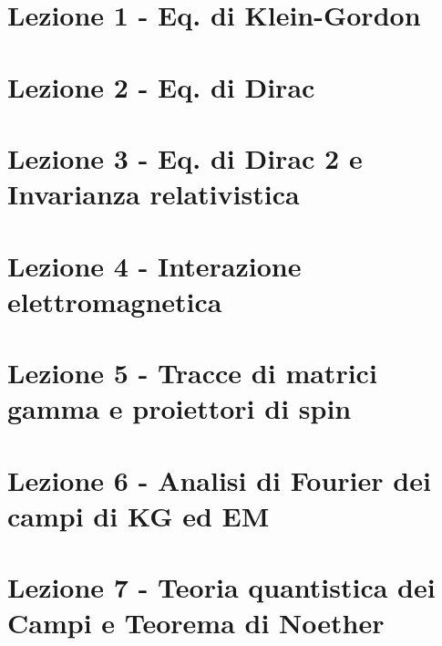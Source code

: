 \documentclass[11pt,a4paper]{book}
\renewcommand{\(}{\left(}
\renewcommand{\)}{\right)}
\begin{document}
 \thispagestyle{empty}
 \begin{titlepage}
 
 \end{titlepage}
 \clearpage{\thispagestyle{empty}\cleardoublepage}
\tableofcontents
\clearpage{\thispagestyle{empty}\cleardoublepage}

\chapter{Lezione 1 - Eq. di Klein-Gordon}
\clearpage{\thispagestyle{empty}\cleardoublepage}
\chapter{Lezione 2 - Eq. di Dirac}
\clearpage{\thispagestyle{empty}\cleardoublepage}
\chapter{Lezione 3 - Eq. di Dirac 2 e Invarianza relativistica}
\clearpage{\thispagestyle{empty}\cleardoublepage}
\chapter{Lezione 4 - Interazione elettromagnetica}
\clearpage{\thispagestyle{empty}\cleardoublepage}
\chapter{Lezione 5 - Tracce di matrici gamma e proiettori di spin}
\clearpage{\thispagestyle{empty}\cleardoublepage}
\chapter{Lezione 6 - Analisi di Fourier dei campi di KG ed EM}
\clearpage{\thispagestyle{empty}\cleardoublepage}
\chapter{Lezione 7 - Teoria quantistica dei Campi e Teorema di Noether}
\clearpage{\thispagestyle{empty}\cleardoublepage}
\end{document}
